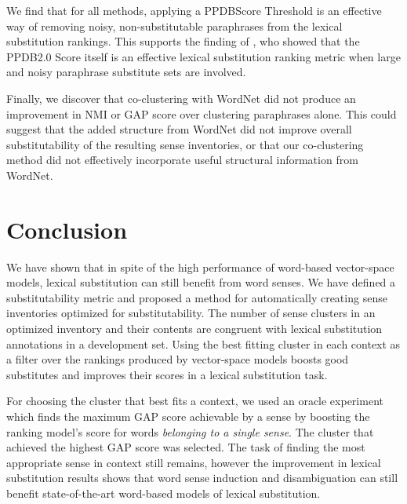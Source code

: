 \documentclass[11pt]{article}
\begin{document}

We find that for all methods, applying a PPDBScore Threshold is an effective way of removing noisy, non-substitutable paraphrases from the lexical substitution rankings. This supports the finding of , who showed that the PPDB2.0 Score itself is an effective lexical substitution ranking metric when large and noisy paraphrase substitute sets are involved.

Finally, we discover that co-clustering with WordNet did not produce an improvement in NMI or GAP score over clustering paraphrases alone. This could suggest that the added structure from WordNet did not improve overall substitutability of the resulting sense inventories, or that our co-clustering method did not effectively incorporate useful structural information from WordNet.


\section{Conclusion}

We have shown that in spite of the high performance of word-based vector-space models, lexical substitution can still benefit from word senses. We have defined a substitutability metric and proposed a method for automatically creating sense inventories optimized for substitutability. The number of sense clusters in an optimized inventory and their contents are congruent with lexical substitution annotations in a development set. Using the best fitting cluster in each context as a filter over the rankings produced by vector-space models boosts good substitutes and improves their scores in a lexical substitution task. 

For choosing the cluster that best fits a context, we used an oracle experiment which finds the maximum GAP score achievable by a sense by boosting the ranking model's score for words \textit{belonging to a single sense}. The cluster that achieved the highest GAP score was selected. The task of finding the most appropriate sense in context still remains, however the improvement in lexical substitution results shows that word sense induction and disambiguation can still benefit state-of-the-art word-based models of lexical substitution. 
\end{document}
